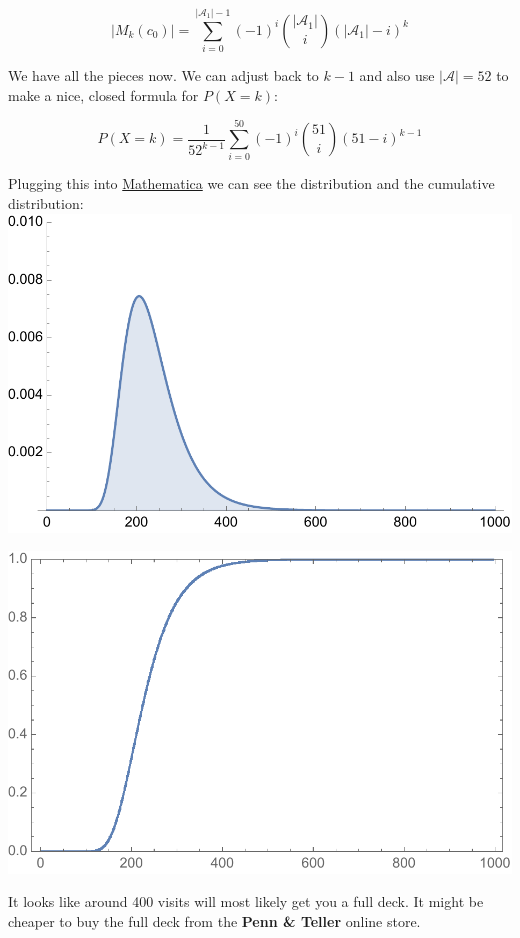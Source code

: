 $$
|M_k(c_0)| = \sum_{i = 0}^{|\mathcal{A}_1| - 1} (-1)^i \binom{|\mathcal{A}_1|}{i} (|\mathcal{A}_1| - i)^k
$$

We have all the pieces now. We can adjust back to $k-1$ and also use $|\mathcal{A}|=52$ to make a nice, closed formula for $P(X=k)$:

$$
P(X=k) = \frac{1}{52^{k-1}} \sum_{i = 0}^{50} (-1)^i \binom{51}{i} (51 - i)^{k-1}
$$

Plugging this into \href{https://www.wolframcloud.com/obj/75d50b79-164a-4bed-a4b5-7592d2488169}{Mathematica} we can see the distribution and the cumulative distribution:\\


\includegraphics[scale=0.7]{probs.pdf}

 
\includegraphics[scale=0.7]{cumulative.pdf}


It looks like around 400 visits will most likely get you a full deck. It might be cheaper to buy the full deck from the \textbf{Penn \& Teller} online store.

